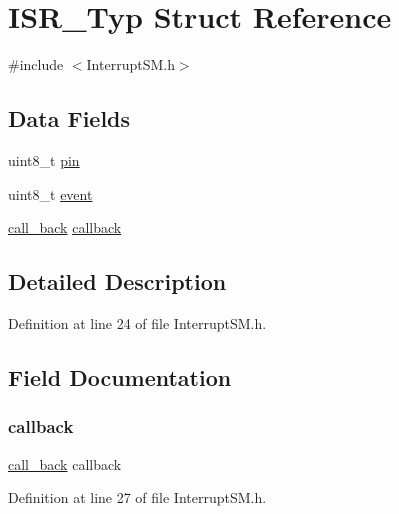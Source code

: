 \hypertarget{struct_i_s_r___typ}{}\section{I\+S\+R\+\_\+\+Typ Struct Reference}
\label{struct_i_s_r___typ}


{\ttfamily \#include $<$Interrupt\+S\+M.\+h$>$}

\subsection*{Data Fields}
\begin{DoxyCompactItemize}
\item 
uint8\+\_\+t \mbox{\hyperlink{struct_i_s_r___typ_ab40a673fb19c1e650e1f79de91788aa5}{pin}}
\item 
uint8\+\_\+t \mbox{\hyperlink{struct_i_s_r___typ_aeef6900f411bc223febdd92c9435693b}{event}}
\item 
\mbox{\hyperlink{_interrupt_s_m_8h_a25782dadcd5c0986f623661a27d786ee}{call\+\_\+back}} \mbox{\hyperlink{struct_i_s_r___typ_a83193f25730f05f9d5a65a18089d5432}{callback}}
\end{DoxyCompactItemize}


\subsection{Detailed Description}


Definition at line 24 of file Interrupt\+S\+M.\+h.



\subsection{Field Documentation}
\mbox{\label{struct_i_s_r___typ_a83193f25730f05f9d5a65a18089d5432}} 
\subsubsection{\texorpdfstring{callback}{callback}}
{\footnotesize\ttfamily \mbox{\hyperlink{_interrupt_s_m_8h_a25782dadcd5c0986f623661a27d786ee}{call\+\_\+back}} callback}



Definition at line 27 of file Interrupt\+S\+M.\+h.

